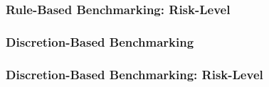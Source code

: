 \documentclass{beamer}
\begin{document}
\begin{frame}
  \frametitle{Rule-Based Benchmarking: Risk-Level}
\end{frame}


\begin{frame}
  \frametitle{Discretion-Based Benchmarking}
\end{frame}


\begin{frame}
  \frametitle{Discretion-Based Benchmarking: Risk-Level}
\end{frame}




  

\end{document}
